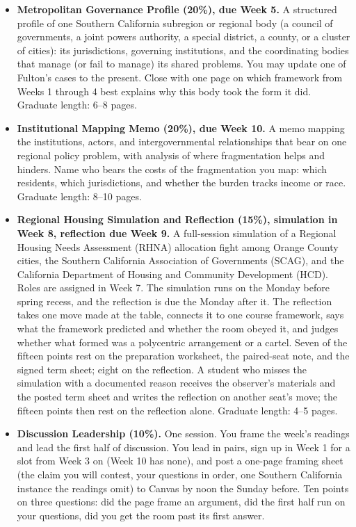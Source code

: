 \documentclass[12pt]{article}
\begin{document}
\begin{itemize}
    \item \textbf{Metropolitan Governance Profile (20\%), due Week 5.} A structured profile of one Southern California subregion or regional body (a council of governments, a joint powers authority, a special district, a county, or a cluster of cities): its jurisdictions, governing institutions, and the coordinating bodies that manage (or fail to manage) its shared problems. You may update one of Fulton's cases to the present. Close with one page on which framework from Weeks 1 through 4 best explains why this body took the form it did. Graduate length: 6--8 pages.
    \item \textbf{Institutional Mapping Memo (20\%), due Week 10.} A memo mapping the institutions, actors, and intergovernmental relationships that bear on one regional policy problem, with analysis of where fragmentation helps and hinders. Name who bears the costs of the fragmentation you map: which residents, which jurisdictions, and whether the burden tracks income or race. Graduate length: 8--10 pages.
    \item \textbf{Regional Housing Simulation and Reflection (15\%), simulation in Week 8, reflection due Week 9.} A full-session simulation of a Regional Housing Needs Assessment (RHNA) allocation fight among Orange County cities, the Southern California Association of Governments (SCAG), and the California Department of Housing and Community Development (HCD). Roles are assigned in Week 7. The simulation runs on the Monday before spring recess, and the reflection is due the Monday after it. The reflection takes one move made at the table, connects it to one course framework, says what the framework predicted and whether the room obeyed it, and judges whether what formed was a polycentric arrangement or a cartel. Seven of the fifteen points rest on the preparation worksheet, the paired-seat note, and the signed term sheet; eight on the reflection. A student who misses the simulation with a documented reason receives the observer's materials and the posted term sheet and writes the reflection on another seat's move; the fifteen points then rest on the reflection alone. Graduate length: 4--5 pages.
    \item \textbf{Discussion Leadership (10\%).} One session. You frame the week's readings and lead the first half of discussion. You lead in pairs, sign up in Week 1 for a slot from Week 3 on (Week 10 has none), and post a one-page framing sheet (the claim you will contest, your questions in order, one Southern California instance the readings omit) to Canvas by noon the Sunday before. Ten points on three questions: did the page frame an argument, did the first half run on your questions, did you get the room past its first answer.

\end{itemize}
\end{document}
